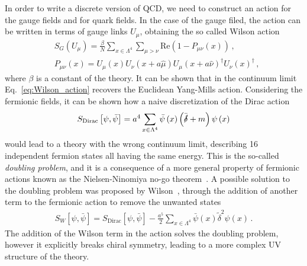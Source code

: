 %
In order to write a discrete version of QCD, we need to construct an action for the gauge fields and for quark fields.
In the case of the gauge filed, the action can be written in terms of gauge links $U_{\mu}$, obtaining the so called Wilson action
\begin{align}
    \label{eq:Wilson_action}
    &S_G\left(U_{\mu}\right) = 
    \frac{\beta}{N}\sum_{x\in \Lambda^4}\sum_{\mu>\nu}\text{Re}\left(1-P_{\mu\nu}\left(x\right)\right)\,, \\
    &P_{\mu\nu}\left(x\right) = U_{\mu}\left(x\right)U_{\nu}\left(x+a\hat{\mu}\right)
    U_{\mu}\left(x+a\hat{\nu}\right)^{\dagger}U_{\nu}\left(x\right)^{\dagger}\,,
\end{align}
where $\beta$ is a constant of the theory. It can be shown that in the continuum limit Eq.~\ref{eq:Wilson_action}
recovers the Euclidean Yang-Mills action.
Considering the fermionic fields, it can be shown how a naive discretization of the Dirac action
\begin{align}
    \label{eq:naive_Dirac}
    S_{\text{Dirac}}\left[\psi,\bar{\psi}\right] = 
    a^4\sum_{x\in\Lambda^4}\bar{\psi}\left(x\right)\left(\bar{\slashed{\delta}} + m\right) \psi\left(x\right)
\end{align}
would lead to a theory with the wrong continuum limit, describing 16 independent fermion states all having the same energy.
This is the so-called \textit{doubling problem}, and it is a consequence of a more general property of 
fermionic actions known as the Nielsen-Ninomiya no-go theorem~\cite{Nielsen:1981hk}.
A possible solution to the doubling problem was proposed by Wilson~\cite{PhysRevD.10.2445}, through the addition of another term to the fermionic action
to remove the unwanted states
\begin{align}
    \label{eq:fermions_wilson_action}
    S_W\left[\psi,\bar{\psi}\right] = S_{\text{Dirac}}\left[\psi,\bar{\psi}\right] 
    - \frac{a^5}{2}\sum_{x\in\Lambda^4}\bar{\psi}\left(x\right)\tilde{\delta}^2 \psi\left(x\right)\,.
\end{align}
The addition of the Wilson term in the action solves the doubling problem, however it explicitly breaks
chiral symmetry, leading to a more complex UV structure of the theory.

